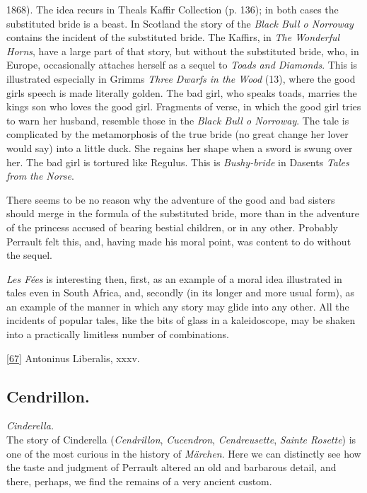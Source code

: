 \documentclass[14pt,a4paper]{memoir}
\begin{document}
1868). The idea recurs in Theal\textquotesingle s Kaffir Collection (p.
136); in both cases the substituted bride is a beast. In Scotland the
story of the \emph{Black Bull o\textquotesingle{} Norroway} contains the
incident of the substituted bride. The Kaffirs, in \emph{The Wonderful
Horns}, have a large part of that story, but without the substituted
bride, who, in Europe, occasionally attaches herself as a sequel to
\emph{Toads and Diamonds}. This is illustrated especially in
Grimm\textquotesingle s \emph{Three Dwarfs in the Wood} (13), where the
good girl\textquotesingle s speech is made literally golden. The bad
girl, who speaks toads, marries the king\textquotesingle s son who loves
the good girl. Fragments of verse, in which the good girl tries to warn
her husband, resemble those in the \emph{Black Bull o\textquotesingle{}
Norroway}. The tale is complicated by the metamorphosis of the true
bride (no great change her lover would say) into \textquotesingle a
little duck.\textquotesingle{} She regains her shape when a sword is
swung over her. The bad girl is tortured like Regulus. This is
\emph{Bushy-bride} in Dasent\textquotesingle s \emph{Tales from the
Norse}.

There seems to be no reason why the adventure of the good and bad
sisters should merge in the formula of the substituted bride, more than
in the adventure of the princess accused of bearing bestial children, or
in any other. Probably Perrault felt this, and, having made his moral
point, was content to do without the sequel.

\emph{Les Fées} is interesting then, first, as an example of a moral
idea illustrated in tales even in South Africa, and, secondly (in its
longer and more usual form), as an example of the manner in which any
story may glide into any other. All the incidents of popular tales, like
the bits of glass in a kaleidoscope, may be shaken into a practically
limitless number of combinations.

\protect\hypertarget{4533318093929944247_33931-h-1.htm.xhtmlux5cux23Footnote_67}{}{}\protect\hyperlink{4533318093929944247_33931-h-1.htm.xhtmlux5cux23FNanchor_67}{{{[}67{]}}}
Antoninus Liberalis, xxxv.

\subsection{Cendrillon.}

\emph{Cinderella.} \\

The story of Cinderella (\emph{Cendrillon}, \emph{Cucendron},
\emph{Cendreusette}, \emph{Sainte Rosette}) is one of the most curious
in the history of \emph{Märchen}. Here we can distinctly see how the
taste and judgment of Perrault altered an old and barbarous detail, and
there, perhaps, we find the remains of a very ancient custom.
\end{document}

